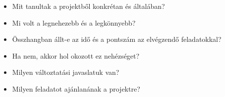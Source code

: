 \begin{itemize}
\item Mit tanultak a projektből konkrétan és általában? \newline
\item Mi volt a legnehezebb és a legkönnyebb? \newline
\item Összhangban állt-e az idő és a pontszám az elvégzendő feladatokkal? \newline
\item Ha nem, akkor hol okozott ez nehézséget? \newline
\item Milyen változtatási javaslatuk van? \newline
\item Milyen feladatot ajánlanának a projektre? \newline

\end{itemize}

